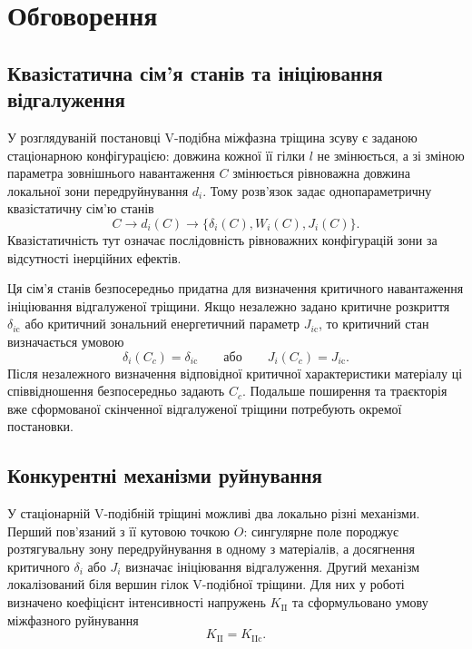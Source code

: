 \section{Обговорення}
\label{sec:discussion}

\subsection{Квазістатична сім'я станів та ініціювання відгалуження}
\label{subsec:discussion-quasistatic}

У розглядуваній постановці V-подібна міжфазна тріщина зсуву є заданою
стаціонарною конфігурацією: довжина кожної її гілки $l$ не змінюється, а
зі зміною параметра зовнішнього навантаження $C$ змінюється рівноважна
довжина локальної зони передруйнування $d_i$. Тому розв'язок задає
однопараметричну квазістатичну сім'ю станів
\begin{equation*}
  C\longrightarrow d_i(C)
  \longrightarrow
  \bigl\{\delta_i(C),W_i(C),J_i(C)\bigr\}.
\end{equation*}
Квазістатичність тут означає послідовність рівноважних конфігурацій зони
за відсутності інерційних ефектів.

Ця сім'я станів безпосередньо придатна для визначення критичного
навантаження ініціювання відгалуженої тріщини. Якщо незалежно задано
критичне розкриття $\delta_{i\mathrm{c}}$ або критичний зональний
енергетичний параметр $J_{i\mathrm{c}}$, то критичний стан визначається
умовою
\begin{equation*}
  \delta_i(C_c)=\delta_{i\mathrm{c}}
  \qquad\text{або}\qquad
  J_i(C_c)=J_{i\mathrm{c}}.
\end{equation*}
Після незалежного визначення відповідної критичної характеристики
матеріалу ці співвідношення безпосередньо задають $C_c$. Подальше
поширення та траєкторія вже сформованої скінченної відгалуженої тріщини
потребують окремої постановки.

\subsection{Конкурентні механізми руйнування}
\label{subsec:discussion-competing}

У стаціонарній V-подібній тріщині можливі два локально різні механізми.
Перший пов'язаний з її кутовою точкою $O$: сингулярне поле породжує
розтягувальну зону передруйнування в одному з матеріалів, а досягнення
критичного $\delta_i$ або $J_i$ визначає ініціювання відгалуження.
Другий механізм локалізований біля вершин гілок V-подібної тріщини.
Для них у роботі~\cite{NazarenkoKipnis2022Equilibrium} визначено
коефіцієнт інтенсивності напружень $K_{\mathrm{II}}$ та сформульовано
умову міжфазного руйнування
\begin{equation*}
  K_{\mathrm{II}}=K_{\mathrm{IIc}}.
\end{equation*}

